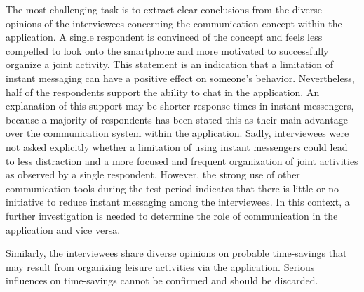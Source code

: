 \documentclass[12pt,numbers=noenddot,parskip,bibliography=totocnumbered,listof=totocnumbered,draft]{scrreprt}
\begin{document}
The most challenging task is to extract clear conclusions from the diverse opinions of the interviewees concerning the communication concept within the application. A single respondent is convinced of the concept and feels less compelled to look onto the smartphone and more motivated to successfully organize a joint activity. This statement is an indication that a limitation of instant messaging can have a positive effect on someone's behavior. Nevertheless, half of the respondents support the ability to chat in the application. An explanation of this support may be shorter response times in instant messengers, because a majority of respondents has been stated this as their main advantage over the communication system within the application. Sadly, interviewees were not asked explicitly whether a limitation of using instant messengers could lead to less distraction and a more focused and frequent organization of joint activities as observed by a single respondent. However, the strong use of other communication tools during the test period indicates that there is little or no initiative to reduce instant messaging among the interviewees. In this context, a further investigation is needed to determine the role of communication in the application and vice versa.

Similarly, the interviewees share diverse opinions on probable time-savings that may result from organizing leisure activities via the application. Serious influences on time-savings cannot be confirmed and should be discarded.
\end{document}
